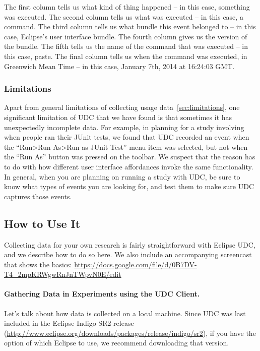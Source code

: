 \vspace{4mm}
The first column tells us what kind of thing happened -- in this case, something was executed.
The second column tells us what was executed -- in this case, a command.
The third column tells us what bundle this event belonged to -- in this case, Eclipse's user interface bundle.
The fourth column gives us the version of the bundle.
The fifth tells us the name of the command that was executed -- in this case, paste.
The final column tells us when the command was executed, in Greenwich Mean Time -- in this case, January 7th, 2014 at 16:24:03 GMT.


\subsubsection{Limitations}

Apart from general limitations of collecting usage data~\ref{sec:limitations},
one significant limitation of UDC that we have found is that sometimes it has 
unexpectedly incomplete data.
For example, in planning for a study involving when people ran their JUnit tests,
we found that UDC recorded an event when the ``Run>Run As>Run as JUnit Test'' menu item was selected,
but not when the ``Run As'' button was pressed on the toolbar.
We suspect that the reason has to do with how different user interface affordances 
invoke the same functionality.
In general, when you are planning on running a study with UDC, be sure to know what 
types of events you are looking for, and test them to make sure UDC captures those events.

\subsection{How to Use It}

Collecting data for your own research is fairly straightforward with Eclipse UDC,
and we describe how to do so here.
We also include an accompanying screencast that shows the basics: 
\url{https://docs.google.com/file/d/0B7DV-T4_2mpKRWgwRnJnTWpvN0E/edit}

\paragraph{Gathering Data in Experiments using the UDC Client.}

Let's talk about how data is collected on a local machine.
Since UDC was last included in the Eclipse Indigo SR2 release 
(\url{http://www.eclipse.org/downloads/packages/release/indigo/sr2}), 
if you have the option of which Eclipse to use, we recommend downloading
that version.

